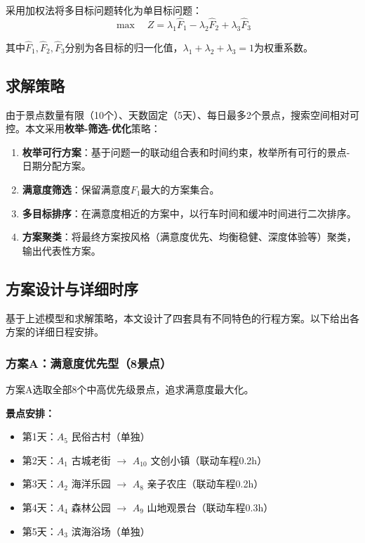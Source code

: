 \documentclass[12pt,a4paper]{ctexart}
\begin{document}
采用加权法将多目标问题转化为单目标问题：
\begin{equation}
\label{eq:multi_obj}
\max \quad Z = \lambda_1 \hat{F}_1 - \lambda_2 \hat{F}_2 + \lambda_3 \hat{F}_3
\end{equation}

其中$\hat{F}_1, \hat{F}_2, \hat{F}_3$分别为各目标的归一化值，$\lambda_1 + \lambda_2 + \lambda_3 = 1$为权重系数。

\subsection{求解策略}

由于景点数量有限（10个）、天数固定（5天）、每日最多2个景点，搜索空间相对可控。本文采用\textbf{枚举-筛选-优化}策略：

\begin{enumerate}
    \item \textbf{枚举可行方案}：基于问题一的联动组合表和时间约束，枚举所有可行的景点-日期分配方案。
    \item \textbf{满意度筛选}：保留满意度$F_1$最大的方案集合。
    \item \textbf{多目标排序}：在满意度相近的方案中，以行车时间和缓冲时间进行二次排序。
    \item \textbf{方案聚类}：将最终方案按风格（满意度优先、均衡稳健、深度体验等）聚类，输出代表性方案。
\end{enumerate}

\subsection{方案设计与详细时序}

基于上述模型和求解策略，本文设计了四套具有不同特色的行程方案。以下给出各方案的详细日程安排。

\subsubsection{方案A：满意度优先型（8景点）}

方案A选取全部8个中高优先级景点，追求满意度最大化。

\textbf{景点安排：}
\begin{itemize}
    \item 第1天：$A_5$ 民俗古村（单独）
    \item 第2天：$A_1$ 古城老街 $\to$ $A_{10}$ 文创小镇（联动车程0.2h）
    \item 第3天：$A_2$ 海洋乐园 $\to$ $A_8$ 亲子农庄（联动车程0.2h）
    \item 第4天：$A_4$ 森林公园 $\to$ $A_9$ 山地观景台（联动车程0.3h）
    \item 第5天：$A_3$ 滨海浴场（单独）
\end{itemize}
\end{document}
